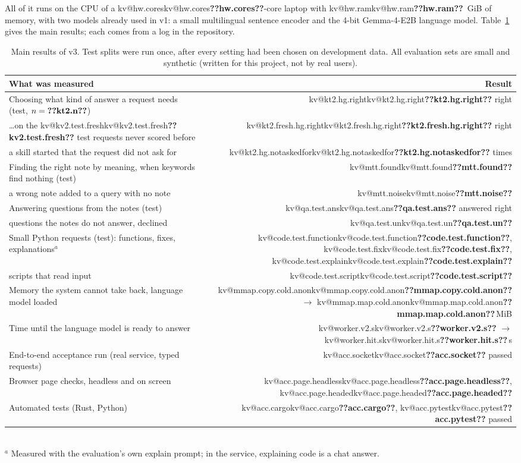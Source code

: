 \documentclass[11pt,a4paper]{article}
\makeatletter
\DeclareRobustCommand{\kv}[1]{\ifcsname kv@#1\endcsname\csname kv@#1\endcsname\else\textbf{??#1??}\fi}
\newcommand{\s}{\,s}
\newcommand{\MiB}{\,MiB}
\makeatother
\begin{document}
All of it runs on the CPU of a \kv{hw.cores}-core laptop with \kv{hw.ram}~GiB of memory, with two
models already used in v1: a small multilingual sentence encoder and the 4-bit Gemma-4-E2B language model.
Table~\ref{tab:headline} gives the main results; each comes from a log in the repository.

\begin{table}[h]
\centering\small
\caption{Main results of v3. Test splits were run once, after every setting had been chosen on development data. All
evaluation sets are small and synthetic (written for this project, not by real users).}
\label{tab:headline}
\begin{tabularx}{\textwidth}{Xr}
\toprule
What was measured & Result \\
\midrule
Choosing what kind of answer a request needs (test, $n=\kv{kt2.n}$) & \kv{kt2.hg.right} right \\
\quad \ldots on the \kv{kv2.test.fresh} test requests never scored before & \kv{kt2.fresh.hg.right} right \\
\quad a skill started that the request did not ask for & \kv{kt2.hg.notaskedfor} times \\
Finding the right note by meaning, when keywords find nothing (test) & \kv{mtt.found} \\
\quad a wrong note added to a query with no note & \kv{mtt.noise} \\
Answering questions from the notes (test) & \kv{qa.test.ans} answered right \\
\quad questions the notes do not answer, declined & \kv{qa.test.un} \\
Small Python requests (test): functions, fixes, explanations$^{a}$ & \kv{code.test.function}, \kv{code.test.fix}, \kv{code.test.explain} \\
\quad scripts that read input & \kv{code.test.script} \\
Memory the system cannot take back, language model loaded & \kv{mmap.copy.cold.anon} $\to$ \kv{mmap.map.cold.anon}\MiB \\
Time until the language model is ready to answer & \kv{worker.v2.s} $\to$ \kv{worker.hit.s}\s \\
End-to-end acceptance run (real service, typed requests) & \kv{acc.socket} passed \\
Browser page checks, headless and on screen & \kv{acc.page.headless}, \kv{acc.page.headed} \\
Automated tests (Rust, Python) & \kv{acc.cargo}, \kv{acc.pytest} passed \\
\bottomrule
\end{tabularx}\\[2pt]
{\footnotesize $^{a}$ Measured with the evaluation's own explain prompt; in the service, explaining code is a chat
answer.}
\end{table}
\end{document}
